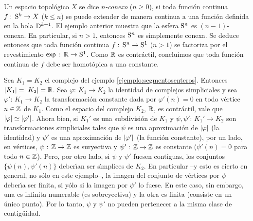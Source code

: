 Un espacio topol\'{o}gico $X$ se dice \emph{$n$-conexo} ($n\geq 0$), si toda
funci\'{o}n continua $f:\,\mathrm{S}^{k}\rightarrow X$ ($k\leq n$) se puede
extender de manera continua a una funci\'{o}n definida en la bola
$\mathrm{D}^{k+1}$. El ejemplo anterior muestra que la esfera $\mathrm{S}^{n}$ es
$(n-1)$-conexa. En particular, si $n>1$, entonces $\mathrm{S}^{n}$ es simplemente
conexa. Se deduce entonces que toda funci\'{o}n continua
$f:\,\mathrm{S}^{n}\rightarrow\mathrm{S}^{1}$ ($n>1$) se factoriza por el revestimiento
$\exp{\null}:\,\bb{R}\rightarrow\esfera{1}$. Como $\mathbb{R}$ es contr\'{a}ctil,
concluimos que toda funci\'{o}n continua de $f$ debe ser homot\'{o}pica a una
constante.

\begin{ejemploHomotopicasNoContiguas}\label{ejemplo:homotopicasnocontiguas}
	Sea $K_{1}=K_{2}$ el complejo del ejemplo
	\ref{ejemplo:segmentosenteros}. Entonces
	$\left|K_{1}\right|=\left|K_{2}\right|=\mathbb{R}$. Sea
	$\varphi:\,K_{1}\rightarrow K_{2}$ la identidad de complejos
	simpliciales y sea $\varphi':\,K_{1}\rightarrow K_{2}$ la
	transformaci\'{o}n constante dada por $\varphi'(n)=0$ en todo
	v\'{e}rtice $n\in\mathbb{Z}$ de $K_{1}$. Como el espacio del complejo
	$K_{2}$, $\mathbb{R}$, es contr\'{a}ctil, vale que
	$\left|\varphi\right|\simeq\left|\varphi'\right|$. Ahora bien, si $K_{1}'$ es una
	subdivisi\'{o}n de $K_{1}$ y $\psi,\psi':\,K_{1}'\rightarrow K_{2}$
	son transformaciones simpliciales tales que $\psi$ es una
	aproximaci\'{o}n de $\left|\varphi\right|$ (la identidad) y $\psi'$ es una
	aproximaci\'{o}n de $\left|\varphi'\right|$ (la funci\'{o}n constante), por
	un lado, en v\'{e}rtices, $\psi:\,\mathbb{Z}\rightarrow\mathbb{Z}$ es
	suryectiva y $\psi':\,\mathbb{Z}\rightarrow\mathbb{Z}$ es constante
	($\psi'(n)=0$ para todo $n\in\mathbb{Z}$). Pero, por otro lado, si
	$\psi$ y $\psi'$ fuesen contiguas, los conjuntos
	$\{\psi(n),\psi'(n)\}$ deber\'{\i}an ser s\'{\i}mplices de $K_{2}$.
	En particular --y esto es cierto en general, no s\'{o}lo en este
	ejemplo--, la imagen del conjunto de v\'{e}rtices por $\psi$
	deber\'{\i}a ser finita, si y\'{o}lo si la imagen por $\psi'$ lo
	fuese. En este caso, sin embargo, una es infinita numerable (es
	sobreyectiva) y la otra es finita (consiste en un \'{u}nico punto).
	Por lo tanto, $\psi$ y $\psi'$ no pueden pertenecer a la misma
	clase de contig\"{u}idad.
\end{ejemploHomotopicasNoContiguas}
